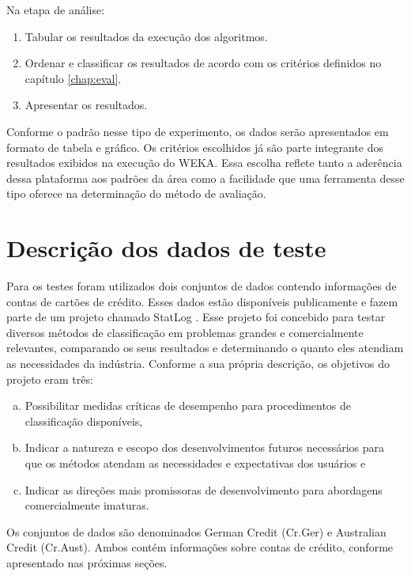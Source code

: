 Na etapa de análise:

\begin{enumerate}
    \item Tabular os resultados da execução dos algoritmos.
    \item Ordenar e classificar os resultados de acordo com os critérios definidos no capítulo \ref{chap:eval}.
    \item Apresentar os resultados.
\end{enumerate}

Conforme o padrão nesse tipo de experimento, os dados serão apresentados em formato de tabela e gráfico. Os critérios escolhidos já são parte integrante dos resultados exibidos na execução do WEKA. Essa escolha reflete tanto a aderência dessa plataforma aos padrões da área como a facilidade que uma ferramenta desse tipo oferece na determinação do método de avaliação.

\section{Descrição dos dados de teste}

Para os testes foram utilizados dois conjuntos de dados contendo informações de contas de cartões de crédito. Esses dados estão disponíveis publicamente e fazem parte de um projeto chamado StatLog \cite{Michie1994}. Esse projeto foi concebido para testar diversos métodos de classificação em problemas grandes e comercialmente relevantes, comparando os seus resultados e determinando o quanto eles atendiam as necessidades da indústria. Conforme a sua própria descrição, os objetivos do projeto eram três:

\begin{enumerate}[a)]
    \item Possibilitar medidas críticas de desempenho para procedimentos de classificação disponíveis,
    \item Indicar a natureza e escopo dos desenvolvimentos futuros necessários para que os métodos atendam as necessidades e expectativas dos usuários e
    \item Indicar as direções mais promissoras de desenvolvimento para abordagens comercialmente imaturas.
\end{enumerate}

Os conjuntos de dados são denominados German Credit (Cr.Ger) e Australian Credit (Cr.Aust). Ambos contém informações sobre contas de crédito, conforme apresentado nas próximas seções.

